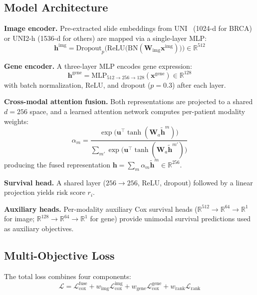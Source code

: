 \documentclass[10pt,twocolumn]{article}
\begin{document}
\subsection{Model Architecture}

\textbf{Image encoder.}
Pre-extracted slide embeddings from UNI~\cite{chen2024uni} (1024-d for
BRCA) or UNI2-h (1536-d for others) are mapped via a single-layer MLP:
\begin{equation}
\mathbf{h}^{\text{img}} = \text{Dropout}_{p}\!\bigl(
\text{ReLU}\bigl(\text{BN}(\mathbf{W}_{\text{img}} \mathbf{x}^{\text{img}})\bigr)\bigr)
\in \mathbb{R}^{512}
\label{eq:img_enc}
\end{equation}

\textbf{Gene encoder.}
A three-layer MLP encodes gene expression:
\begin{equation}
\mathbf{h}^{\text{gene}} = \text{MLP}_{512 \to 256 \to 128}(\mathbf{x}^{\text{gene}})
\in \mathbb{R}^{128}
\label{eq:gene_enc}
\end{equation}
with batch normalization, ReLU, and dropout ($p\!=\!0.3$) after each layer.

\textbf{Cross-modal attention fusion.}
Both representations are projected to a shared $d\!=\!256$ space, and a
learned attention network computes per-patient modality weights:
\begin{equation}
\alpha_m = \frac{
  \exp\!\bigl(\mathbf{u}^\top \tanh(\mathbf{W}_a \tilde{\mathbf{h}}^m)\bigr)
}{
  \sum_{m'} \exp\!\bigl(\mathbf{u}^\top \tanh(\mathbf{W}_a \tilde{\mathbf{h}}^{m'})\bigr)
}
\label{eq:attn}
\end{equation}
producing the fused representation
$\mathbf{h} = \sum_m \alpha_m \tilde{\mathbf{h}}^m \in \mathbb{R}^{256}$.

\textbf{Survival head.}
A shared layer ($256 \to 256$, ReLU, dropout) followed by a linear
projection yields risk score $r_i$.

\textbf{Auxiliary heads.}
Per-modality auxiliary Cox survival heads
($\mathbb{R}^{512} \to \mathbb{R}^{64} \to \mathbb{R}^{1}$ for image;
$\mathbb{R}^{128} \to \mathbb{R}^{64} \to \mathbb{R}^{1}$ for gene)
provide unimodal survival predictions used as auxiliary objectives.

\subsection{Multi-Objective Loss}

The total loss combines four components:
\begin{equation}
\mathcal{L} = \mathcal{L}_{\text{cox}}^{\text{fuse}} +
w_{\text{img}} \mathcal{L}_{\text{cox}}^{\text{img}} +
w_{\text{gene}} \mathcal{L}_{\text{cox}}^{\text{gene}} +
w_{\text{rank}} \mathcal{L}_{\text{rank}}
\label{eq:total_loss}
\end{equation}
\end{document}
